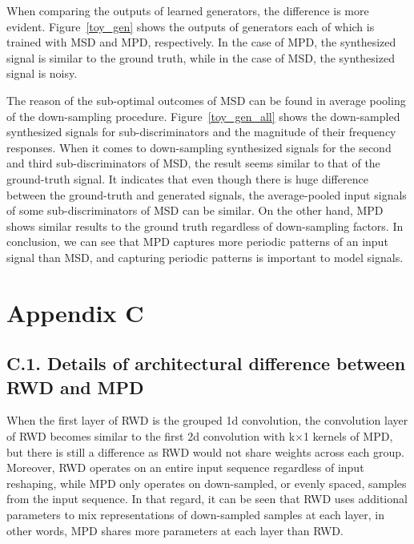 When comparing the outputs of learned generators, the difference is more evident. Figure~\ref{toy_gen} shows the outputs of generators each of which is trained with MSD and MPD, respectively. In the case of MPD, the synthesized signal is similar to the ground truth, while in the case of MSD, the synthesized signal is noisy.

The reason of the sub-optimal outcomes of MSD can be found in average pooling of the down-sampling procedure. Figure~\ref{toy_gen_all} shows the down-sampled synthesized signals for sub-discriminators and the magnitude of their frequency responses. When it comes to down-sampling synthesized signals for the second and third sub-discriminators of MSD, the result seems similar to that of the ground-truth signal. It indicates that even though there is huge difference between the ground-truth and generated signals, the average-pooled input signals of some sub-discriminators of MSD can be similar. On the other hand, MPD shows similar results to the ground truth regardless of down-sampling factors. In conclusion, we can see that MPD captures more periodic patterns of an input signal than MSD, and capturing periodic patterns is important to model signals.


\label{app-c}
\section*{Appendix C}
\label{app-c1}
\subsection*{C.1. Details of architectural difference between RWD and MPD}
When the first layer of RWD is the grouped 1d convolution, the convolution layer of RWD becomes similar to the first 2d convolution with k$\times$1 kernels of MPD, but there is still a difference as RWD would not share weights across each group. Moreover, RWD operates on an entire input sequence regardless of input reshaping, while MPD only operates on down-sampled, or evenly spaced, samples from the input sequence. In that regard, it can be seen that RWD uses additional parameters to mix representations of down-sampled samples at each layer, in other words, MPD shares more parameters at each layer than RWD.



